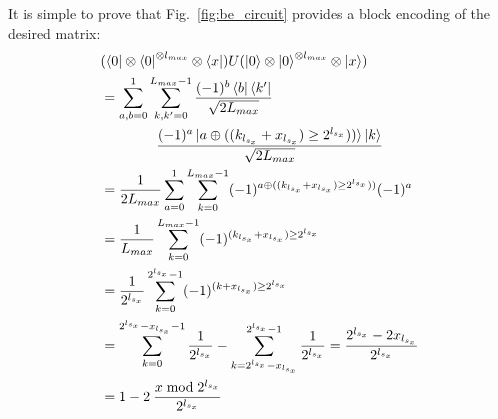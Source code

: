 \documentclass[a4paper,twocolumn,,accepted=2025-05-27]{quantumarticle}
\theoremstyle{empty}
\begin{document}
It is simple to prove that Fig.~\ref{fig:be_circuit} provides a block encoding of the desired matrix:
\begin{align*}
&(\bra{0}\otimes\bra{0}^{\otimes l_{max}}\otimes\bra{x}) U (\ket{0}\otimes\ket{0}^{\otimes l_{max}}\otimes\ket{x}) \\
&= \sum_{a,b=0}^1\sum_{k,k'=0}^{L_{max}-1} \frac{(-1)^b \bra{b}\bra{k'}}{\sqrt{2L_{max}}} \\
& \qquad\qquad \frac{(-1)^{a}\ket{a \oplus ((k_{l_{s_x}}+x_{l_{s_x}})\ge 2^{l_{s_x}}))}\ket{k}}{\sqrt{2L_{max}}}\\
&=  \frac{1}{2L_{max}}\sum_{a=0}^1\sum_{k=0}^{L_{max}-1} (-1)^{a \oplus ((k_{l_{s_x}}+x_{l_{s_x}})\ge 2^{l_{s_x}}))} (-1)^a\\
&= \frac{1}{L_{max}}\sum_{k=0}^{L_{max}-1}  (-1)^{(k_{l_{s_x}}+x_{l_{s_x}})\ge 2^{l_{s_x}}}\\
&= \frac{1}{2^{l_{s_x}}}\sum_{k=0}^{2^{l_{s_x}}-1} (-1)^{(k+x_{l_{s_x}})\ge 2^{l_{s_x}}} \\
&= \sum_{k=0}^{2^{l_{s_x}}-x_{l_{s_x}}-1} \frac{1}{2^{l_{s_x}}}-\sum_{k=2^{l_{s_x}}-x_{l_{s_x}}}^{2^{l_{s_x}}-1} \frac{1}{2^{l_{s_x}}} = \frac{2^{l_{s_x}}-2x_{l_{s_x}}}{2^{l_{s_x}}}\\
&= 1 - 2\>\frac{x \bmod 2^{l_{s_x}}}{2^{l_{s_x}}}
\end{align*}
\end{document}
